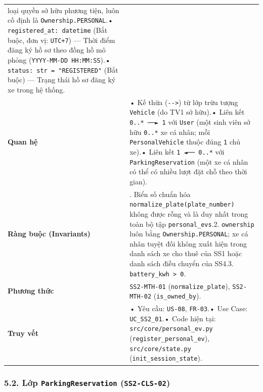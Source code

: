 \documentclass[11pt,a4paper]{article}
\begin{document}
\begin{longtable}[]{@{}
  >{\raggedright\arraybackslash}p{}
  >{\raggedright\arraybackslash}p{}@{}}
loại quyền sở hữu phương tiện, luôn cố định là
\texttt{Ownership.PERSONAL}.• \texttt{registered\_at:\ datetime} (Bắt
buộc, đơn vị: \texttt{UTC+7}) --- Thời điểm đăng ký hồ sơ theo đồng hồ
mô phỏng (\texttt{YYYY-MM-DD\ HH:MM:SS}).•
\texttt{status:\ str\ =\ "REGISTERED"} (Bắt buộc) --- Trạng thái hồ sơ
đăng ký xe trong hệ thống. \\
\textbf{Quan hệ} & • Kế thừa (\texttt{-\/-\textbar{}\textgreater{}}) từ
lớp trừu tượng \texttt{Vehicle} (do TV1 sở hữu).• Liên kết
\texttt{0..*\ ──►\ 1} với \texttt{User} (một sinh viên sở hữu
\texttt{0..*} xe cá nhân; mỗi \texttt{PersonalVehicle} thuộc đúng
\texttt{1} chủ xe).• Liên kết \texttt{1\ ◄──\ 0..*} với
\texttt{ParkingReservation} (một xe cá nhân có thể có nhiều lượt đặt chỗ
theo thời gian). \\
\textbf{Ràng buộc (Invariants)} & 1. Biển số chuẩn hóa
\texttt{normalize\_plate(plate\_number)} không được rỗng và là duy nhất
trong toàn bộ tập \texttt{personal\_evs}.2. \texttt{ownership} luôn bằng
\texttt{Ownership.PERSONAL}; xe cá nhân tuyệt đối không xuất hiện trong
danh sách xe cho thuê của SS1 hoặc danh sách điều chuyển của SS4.3.
\texttt{battery\_kwh\ \textgreater{}\ 0}. \\
\textbf{Phương thức} & \texttt{SS2-MTH-01} (\texttt{normalize\_plate}),
\texttt{SS2-MTH-02} (\texttt{is\_owned\_by}). \\
\textbf{Truy vết} & • Yêu cầu: \texttt{US-08}, \texttt{FR-03}.• Use
Case: \texttt{UC\_SS2\_01}.• Code hiện tại:
\texttt{src/core/personal\_ev.py} (\texttt{register\_personal\_ev}),
\texttt{src/core/state.py} (\texttt{init\_session\_state}). \\
\end{longtable}

\hypertarget{lux1edbp-parkingreservation-ss2-cls-02}{%
\subsubsection{\texorpdfstring{5.2. Lớp \texttt{ParkingReservation}
(\texttt{SS2-CLS-02})}{5.2. Lớp ParkingReservation (SS2-CLS-02)}}\label{lux1edbp-parkingreservation-ss2-cls-02}}
\end{document}
